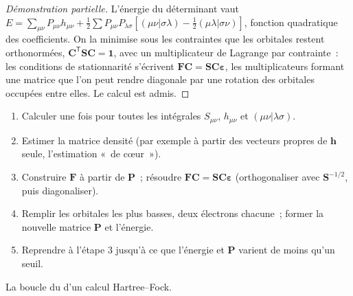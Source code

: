 \begin{proof}[Démonstration partielle]
L'énergie du déterminant vaut $E = \sum_{\mu\nu}P_{\mu\nu}h_{\mu\nu} + \frac12
\sum P_{\mu\nu}P_{\lambda\sigma}[(\mu\nu|\sigma\lambda) - \frac12(\mu\lambda|\sigma\nu)]$,
fonction quadratique des coefficients. On la minimise sous les
contraintes que les orbitales restent orthonormées, $\mathbf C^{\mathsf T}\mathbf S\mathbf C = \mathbf 1$,
avec un multiplicateur de Lagrange par contrainte~: les conditions de
stationnarité s'écrivent $\mathbf F\mathbf C = \mathbf S\mathbf C\boldsymbol\varepsilon$,
les multiplicateurs formant une matrice que l'on peut rendre diagonale
par une rotation des orbitales occupées entre elles. Le calcul est admis.
\end{proof}

\begin{method}\label{met:b3:computational-chemistry:scf}
\begin{enumerate}
  \item Calculer une fois pour toutes les intégrales $S_{\mu\nu}$, $h_{\mu\nu}$ et $(\mu\nu|\lambda\sigma)$.
  \item Estimer la matrice densité (par exemple à partir des vecteurs
        propres de $\mathbf h$ seule, l'estimation «~de cœur~»).
  \item Construire $\mathbf F$ à partir de $\mathbf P$~; résoudre $\mathbf F\mathbf C = \mathbf S\mathbf C
        \boldsymbol\varepsilon$ (orthogonaliser avec $\mathbf S^{-1/2}$,
        puis diagonaliser).
  \item Remplir les orbitales les plus basses, deux électrons chacune~;
        former la nouvelle matrice $\mathbf P$ et l'énergie.
  \item Reprendre à l'étape 3 jusqu'à ce que l'énergie et $\mathbf P$
        varient de moins qu'un seuil.
\end{enumerate}
\end{method}

\begin{omfigure}

{\small La boucle du  d'un calcul Hartree--Fock.}
\end{omfigure}

